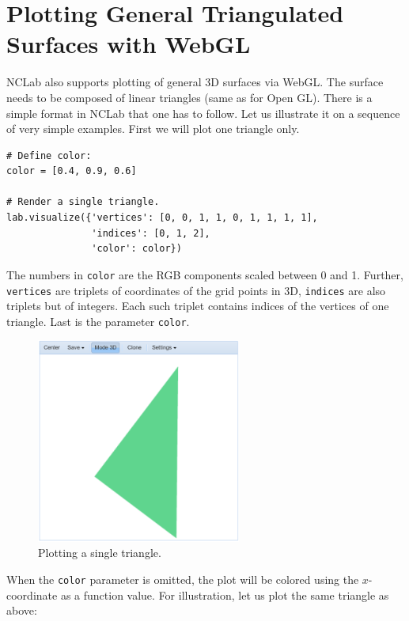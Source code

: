 \documentclass[article,A4,12pt]{llncs}
\begin{document}
\section{Plotting General Triangulated Surfaces with WebGL}

NCLab also supports plotting of general 3D surfaces via WebGL. The surface needs 
to be composed of linear triangles (same as for Open GL). There is a simple 
format in NCLab that one has to follow. Let us illustrate it on a sequence of very 
simple examples. First we will plot one triangle only. 

\begin{verbatim}
# Define color:
color = [0.4, 0.9, 0.6]

# Render a single triangle.
lab.visualize({'vertices': [0, 0, 1, 1, 0, 1, 1, 1, 1], 
               'indices': [0, 1, 2],
               'color': color})
\end{verbatim}
The numbers in {\tt color} are the RGB components scaled between 0 and 1. Further,
{\tt vertices} are triplets of coordinates of the grid points in 3D, {\tt indices}
are also triplets but of integers. Each such triplet contains indices of the vertices
of one triangle. Last is the parameter {\tt color}. 

\begin{figure}[!ht]
\begin{center}
\includegraphics[width=0.6\textwidth]{img/tria1.png}
\end{center}
\vspace{-2mm}
\caption{Plotting a single triangle.}
\label{fig:tria1}
\end{figure}
\noindent
When the {\tt color} parameter is omitted, the plot will be colored 
using the $x$-coordinate as a function value. For illustration, let us plot the 
same triangle as above:
\end{document}
